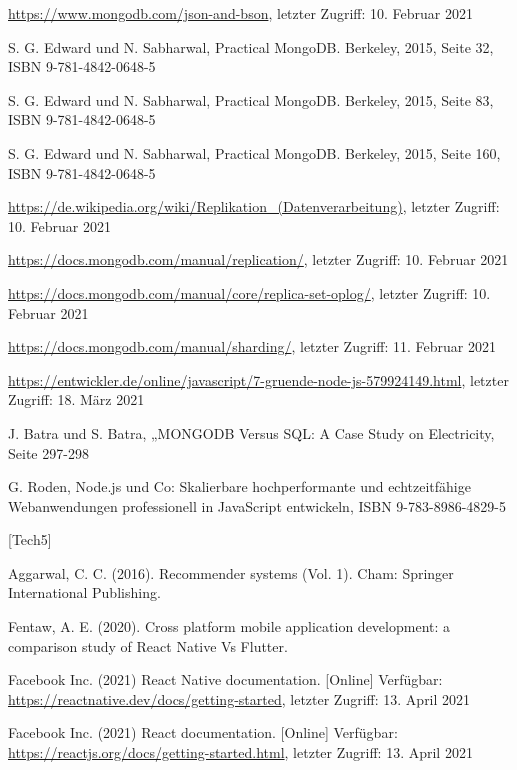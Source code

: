 \documentclass[11pt,a4paper]{article}
\begin{document}
\begin{itemize}
 \url{https://www.mongodb.com/json-and-bson}, letzter Zugriff: 10. Februar 2021

 S. G. Edward und N. Sabharwal, Practical MongoDB. Berkeley, 2015, Seite 32, ISBN 9-781-4842-0648-5

 S. G. Edward und N. Sabharwal, Practical MongoDB. Berkeley, 2015, Seite 83, ISBN 9-781-4842-0648-5

 S. G. Edward und N. Sabharwal, Practical MongoDB. Berkeley, 2015, Seite 160, ISBN 9-781-4842-0648-5

 \url{https://de.wikipedia.org/wiki/Replikation_(Datenverarbeitung)}, letzter Zugriff: 10. Februar 2021

 \url{https://docs.mongodb.com/manual/replication/}, letzter Zugriff: 10. Februar 2021

 \url{https://docs.mongodb.com/manual/core/replica-set-oplog/}, letzter Zugriff: 10. Februar 2021

 \url{https://docs.mongodb.com/manual/sharding/}, letzter Zugriff: 11. Februar 2021

%
%
%
%


 \url{https://entwickler.de/online/javascript/7-gruende-node-js-579924149.html}, letzter Zugriff: 18. März 2021

 J. Batra und S. Batra, „MONGODB Versus SQL: A Case Study on Electricity, Seite 297-298

 G. Roden, Node.js und Co: Skalierbare hochperformante und echtzeitfähige Webanwendungen professionell in JavaScript entwickeln, ISBN 9-783-8986-4829-5

[Tech5]


%
%
%
%
%


	 Aggarwal, C. C. (2016). Recommender systems (Vol. 1). Cham: Springer International Publishing.

	 Fentaw, A. E. (2020). Cross platform mobile application development: a comparison study of React Native Vs Flutter.

	 Facebook Inc. (2021) React Native documentation. [Online] Verfügbar: \url{https://reactnative.dev/docs/getting-started}, letzter Zugriff: 13. April 2021

	 Facebook Inc. (2021) React documentation. [Online] Verfügbar: \url{https://reactjs.org/docs/getting-started.html}, letzter Zugriff: 13. April 2021


\end{itemize}
\end{document}
